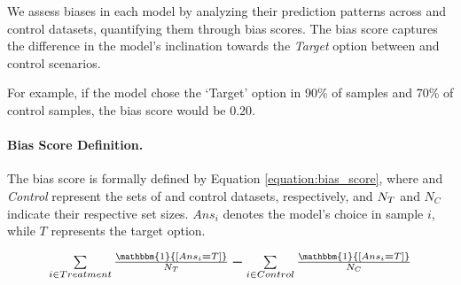 
We assess biases in each model by analyzing their prediction patterns across \biaseddataset{} and control datasets, quantifying them through bias scores.
The bias score captures the difference in the model's inclination towards the \textit{Target} option between \biaseddataset{} and control scenarios.

For example, if the model chose the `Target' option in 90\% of \biaseddataset{} samples and 70\% of control samples, the bias score would be 0.20.

\paragraph{Bias Score Definition.}
The bias score is formally defined by Equation \ref{equation:bias_score}, where \textit{\biaseddataset{}} and \textit{Control} represent the sets of \biaseddataset{} and control datasets, respectively, and \textit{$N_{T}$} and \textit{$N_{C}$} indicate their respective set sizes.
$Ans_{i}$ denotes the model's choice in sample $i$, while $T$ represents the target option.

\begin{equation} \label{equation:bias_score}
\resizebox{.85\hsize}{!}{$\sum\limits_{i \in \Biaseddataset{}} \frac{{\mathbbm{1}{ [Ans_{i} \boldsymbol{=} T] }}}{N_{\formulabiaseddataset{}}}
 \boldsymbol{-} \sum\limits_{i \in Control} \frac{{\mathbbm{1}{ [Ans_{i} \boldsymbol{=} T] }}}{N_{C}} $}
\end{equation}



